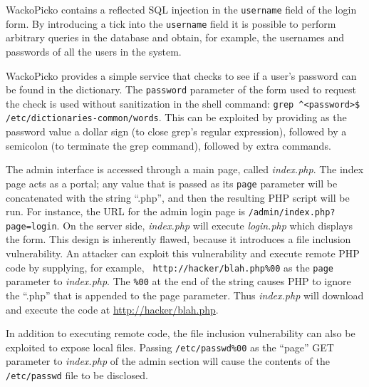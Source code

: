 WackoPicko contains a reflected SQL injection in the {\tt user\-name}
field of the login form. By introducing a tick into
the {\tt username} field it is possible to perform arbitrary queries in the 
database and obtain, for example, the usernames and passwords of
all the users in the system.

WackoPicko provides a simple service that
checks to see if a user's password can be found in the dictionary. The 
{\tt password} parameter of the form used to request the check is used
without sanitization in the shell command: {\tt grep \verb|^|<password>\$ 
/etc/dictionaries-common/words}. This can be exploited by providing as
the password value a
dollar sign (to close grep's regular expression), followed by a semicolon (to
terminate the grep command), 
followed by extra commands.

The admin interface is accessed through a main page, called {\em index.php}.
The index page acts as a portal; any value that is passed as its
{\tt page} parameter will be concatenated with
the string ``.php'', and then
the resulting PHP script will be run. For instance, the URL for the admin login page is
{\tt /admin\-/index.php?\-page=login}. On the server side, \emph{index.php} will
execute \emph{login.php} which displays the form. This design is inherently flawed, because it
introduces a file inclusion vulnerability. An attacker can
exploit this vulnerability and execute remote PHP code by supplying, for
example,  {\tt
  http://hacker/\-blah.php\%00} as the {\tt page} parameter to \emph{index.php}.
The {\tt \%00} at the end of the string causes PHP to ignore the ``.php'' that
is appended to the page parameter. Thus \emph{index.php} will download and
execute the code at \url{http://hacker/blah.php}.

In addition to executing remote code, the file inclusion vulnerability can
also be exploited to expose local files. Passing {\tt/etc/passwd\%00} as the
``page'' GET parameter to \emph{index.php} of the admin section will cause the
contents of the {\tt/etc/passwd} file to be disclosed.

